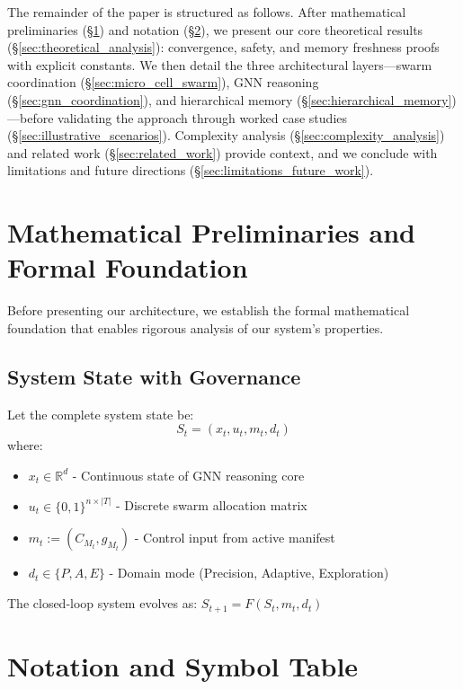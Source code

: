 \documentclass{article}
\begin{document}
    The remainder of the paper is structured as follows. After mathematical preliminaries (\S\ref{sec:mathematical_preliminaries}) and notation (\S\ref{sec:notation_symbols}), we present our core theoretical results (\S\ref{sec:theoretical_analysis}): convergence, safety, and memory freshness proofs with explicit constants. We then detail the three architectural layers---swarm coordination (\S\ref{sec:micro_cell_swarm}), GNN reasoning (\S\ref{sec:gnn_coordination}), and hierarchical memory (\S\ref{sec:hierarchical_memory})---before validating the approach through worked case studies (\S\ref{sec:illustrative_scenarios}). Complexity analysis (\S\ref{sec:complexity_analysis}) and related work (\S\ref{sec:related_work}) provide context, and we conclude with limitations and future directions (\S\ref{sec:limitations_future_work}).

\section{Mathematical Preliminaries and Formal Foundation}
\label{sec:mathematical_preliminaries}

Before presenting our architecture, we establish the formal mathematical foundation that enables rigorous analysis of our system's properties.

\subsection{System State with Governance}

Let the complete system state be:
$$S_t = (x_t, u_t, m_t, d_t)$$
where:
\begin{itemize}
\item $x_t \in \mathbb{R}^d$ - Continuous state of GNN reasoning core
\item $u_t \in \{0,1\}^{n \times |T|}$ - Discrete swarm allocation matrix  
\item $m_t := (C_{M_t}, g_{M_t})$ - Control input from active manifest
\item $d_t \in \{P, A, E\}$ - Domain mode (Precision, Adaptive, Exploration)
\end{itemize}

The closed-loop system evolves as: $S_{t+1} = F(S_t, m_t, d_t)$



\section{Notation and Symbol Table}
\label{sec:notation_symbols}
\end{document}
